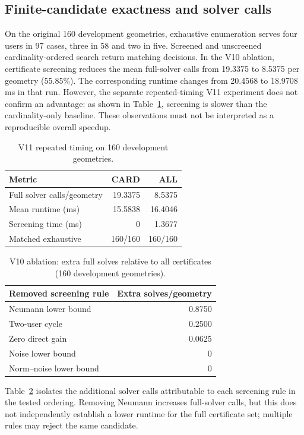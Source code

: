 \documentclass[journal]{IEEEtran}
\begin{document}
\subsection{Finite-candidate exactness and solver calls}
On the original 160 development geometries, exhaustive enumeration serves four users in 97 cases, three in 58 and two in five. Screened and unscreened cardinality-ordered search return matching decisions. In the V10 ablation, certificate screening reduces the mean full-solver calls from 19.3375 to 8.5375 per geometry (55.85\%). The corresponding runtime changes from 20.4568 to 18.9708 ms in that run. However, the separate repeated-timing V11 experiment does not confirm an advantage: as shown in Table~\ref{tab:v11}, screening is slower than the cardinality-only baseline. These observations must not be interpreted as a reproducible overall speedup.
\begin{table}[t]
\caption{V11 repeated timing on 160 development geometries.}
\label{tab:v11}\centering\footnotesize
\begin{tabular}{lrr}\toprule
Metric & CARD & ALL\\\midrule
Full solver calls/geometry & 19.3375 & 8.5375\\
Mean runtime (ms) & 15.5838 & 16.4046\\
Screening time (ms) & 0 & 1.3677\\
Matched exhaustive & 160/160 & 160/160\\\bottomrule
\end{tabular}
\end{table}


\begin{table}[t]
\caption{V10 ablation: extra full solves relative to all certificates (160 development geometries).}
\label{tab:v10abl}\centering\footnotesize
\begin{tabular}{lr}\toprule
Removed screening rule & Extra solves/geometry\\\midrule
Neumann lower bound & 0.8750\\
Two-user cycle & 0.2500\\
Zero direct gain & 0.0625\\
Noise lower bound & 0\\
Norm--noise lower bound & 0\\\bottomrule
\end{tabular}
\end{table}
Table~\ref{tab:v10abl} isolates the additional solver calls attributable to each screening rule in the tested ordering. Removing Neumann increases full-solver calls, but this does not independently establish a lower runtime for the full certificate set; multiple rules may reject the same candidate.
\end{document}

